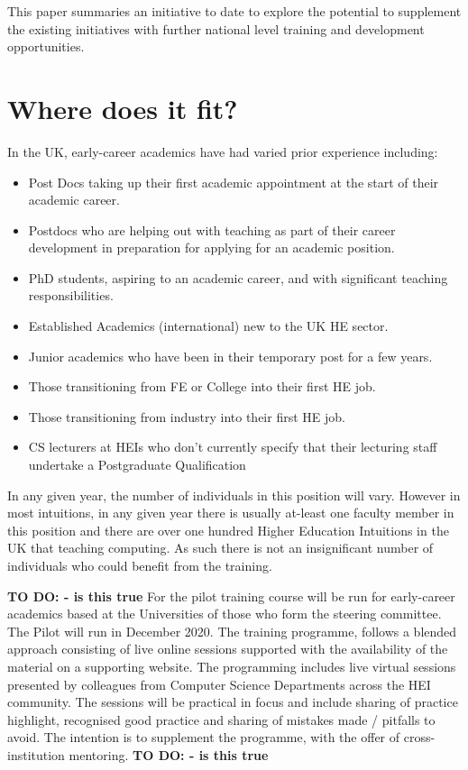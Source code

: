 \documentclass[sigconf]{acmart}
\begin{document}
This paper summaries an initiative to date to explore the potential to supplement the existing initiatives with further national level training and development opportunities.

\section{Where does it fit?}
In the UK, early-career academics have had varied prior experience including:
\begin{itemize}
\item Post Docs taking up their first academic appointment at the start of their academic career.
\item Postdocs who are helping out with teaching as part of their career development in preparation for applying for an academic position.
\item PhD students, aspiring to an academic career, and with significant teaching responsibilities.
\item Established Academics (international) new to the UK HE sector.
\item Junior academics who have been in their temporary post for a few years.
\item Those transitioning from FE or College into their first HE job.
\item Those transitioning from industry into their first HE job.
\item CS lecturers at HEIs who don’t currently specify that their lecturing staff undertake  a Postgraduate Qualification
\end{itemize}

In any given year, the number of individuals in this position will vary. However in most intuitions, in any given year there is usually at-least one faculty member in this position and there are over one hundred Higher Education Intuitions in the UK that teaching computing. As such there is not an insignificant number of individuals who could benefit from the training.

\textbf{TO DO: - is this true}
For the pilot training course will be run for early-career academics based at the Universities of those who form the steering committee. The Pilot will run in December 2020. The training programme, follows a blended approach consisting of live online sessions supported with the availability of the material on a supporting website. The programming includes live virtual sessions presented by colleagues from Computer Science Departments across the HEI community. The sessions will be practical in focus and include sharing of practice highlight, recognised good practice and sharing of mistakes made / pitfalls to avoid. The intention is to supplement the programme, with the offer of cross-institution mentoring.
\textbf{TO DO: - is this true}
\end{document}
